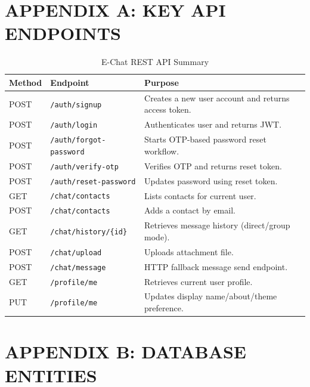 \documentclass[12pt,a4paper,oneside]{report}
\begin{document}
\cleardoublepage

\chapter*{APPENDIX A: KEY API ENDPOINTS}
{}
\label{front:appendix-a}
\thispagestyle{plain}

\begin{table}[H]
\centering
\caption{E-Chat REST API Summary}
{\small
\begin{tabularx}{\textwidth}{|L{1.5cm}|L{5.2cm}|X|}
\hline
\textbf{Method} & \textbf{Endpoint} & \textbf{Purpose} \\
\hline
POST & \texttt{/auth/signup} & Creates a new user account and returns access token. \\
\hline
POST & \texttt{/auth/login} & Authenticates user and returns JWT. \\
\hline
POST & \texttt{/auth/forgot-password} & Starts OTP-based password reset workflow. \\
\hline
POST & \texttt{/auth/verify-otp} & Verifies OTP and returns reset token. \\
\hline
POST & \texttt{/auth/reset-password} & Updates password using reset token. \\
\hline
GET & \texttt{/chat/contacts} & Lists contacts for current user. \\
\hline
POST & \texttt{/chat/contacts} & Adds a contact by email. \\
\hline
GET & \texttt{/chat/history/\{id\}} & Retrieves message history (direct/group mode). \\
\hline
POST & \texttt{/chat/upload} & Uploads attachment file. \\
\hline
POST & \texttt{/chat/message} & HTTP fallback message send endpoint. \\
\hline
GET & \texttt{/profile/me} & Retrieves current user profile. \\
\hline
PUT & \texttt{/profile/me} & Updates display name/about/theme preference. \\
\hline
\end{tabularx}}
\end{table}

\cleardoublepage

\chapter*{APPENDIX B: DATABASE ENTITIES}
{}
\label{front:appendix-b}
\thispagestyle{plain}
\end{document}
